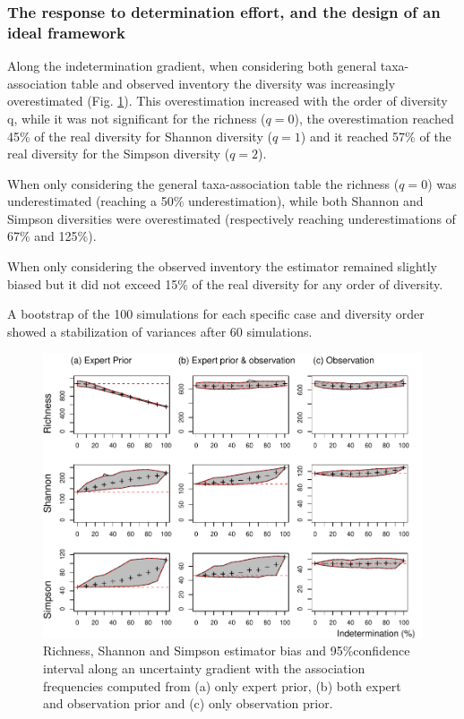 \documentclass[
  11pt,
  french,
  A4paper,
  extrafontsizes,onecolumn,openright
  ]{memoir}
\begin{document}
\subsubsection{The response to determination effort, and the design of
an ideal
framework}\label{the-response-to-determination-effort-and-the-design-of-an-ideal-framework}

Along the indetermination gradient, when considering both general
taxa-association table and observed inventory the diversity was
increasingly overestimated (Fig. \ref{fig:UncertGrad}). This
overestimation increased with the order of diversity q, while it was not
significant for the richness (\(q=0\)), the overestimation reached 45\%
of the real diversity for Shannon diversity (\(q = 1\)) and it reached
57\% of the real diversity for the Simpson diversity (\(q = 2\)).

When only considering the general taxa-association table the richness
(\(q=0\)) was underestimated (reaching a 50\% underestimation), while
both Shannon and Simpson diversities were overestimated (respectively
reaching underestimations of 67\% and 125\%).

When only considering the observed inventory the estimator remained
slightly biased but it did not exceed 15\% of the real diversity for any
order of diversity.

A bootstrap of the 100 simulations for each specific case and diversity
order showed a stabilization of variances after 60 simulations.

\begin{figure}

{\centering \includegraphics[width=1\linewidth]{Manuscript_files/figure-latex/UncertGrad-1} 

}

\caption{Richness, Shannon and Simpson estimator bias and 95\%confidence interval along an uncertainty gradient with the association frequencies computed from (a) only expert prior, (b) both expert and observation prior and (c) only observation prior.}\label{fig:UncertGrad}
\end{figure}
\end{document}
